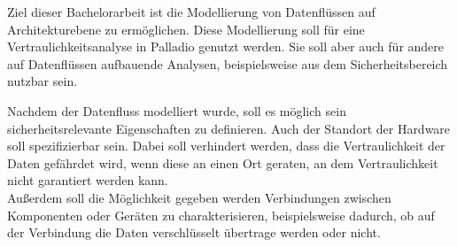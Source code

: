 Ziel dieser Bachelorarbeit ist die Modellierung von Datenflüssen auf Architekturebene zu ermöglichen. Diese Modellierung soll für eine Vertraulichkeitsanalyse in Palladio genutzt werden. Sie soll aber auch für andere auf Datenflüssen aufbauende Analysen, beispielsweise aus dem Sicherheitsbereich nutzbar sein. \par
Nachdem der Datenfluss modelliert wurde, soll es möglich sein sicherheitsrelevante Eigenschaften zu definieren.
Auch der Standort der Hardware soll spezifizierbar sein. Dabei soll verhindert werden, dass die Vertraulichkeit der Daten gefährdet wird, wenn diese an einen Ort geraten, an dem Vertraulichkeit nicht garantiert werden kann. \\
Außerdem soll die Möglichkeit gegeben werden Verbindungen zwischen Komponenten oder Geräten zu charakterisieren, beispielsweise dadurch, ob auf der Verbindung die Daten verschlüsselt übertrage werden oder nicht. \\

